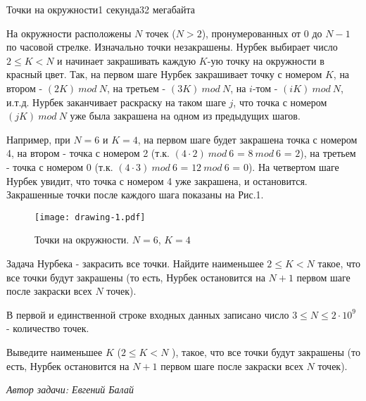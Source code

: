 \documentclass[11pt,a4paper,oneside]{article}
\begin{document}
\begin{problem}{Точки на окружности}{1 секунда}{32 мегабайта}

\noindent
На окружности расположены $N$ точек ($N>2$), пронумерованных от $0$ до $N-1$ по часовой стрелке. 
Изначально точки незакрашены.
Нурбек выбирает число $2 \le K < N$ и начинает закрашивать каждую $K$-ую точку на окружности в красный цвет.
Так, на первом шаге Нурбек закрашивает точку с номером $K$, на втором - $(2K)~mod~N$, на третьем  - $(3K)~mod~N$, на $i$-том - $(iK)~mod~N$, и.т.д. Нурбек заканчивает раскраску на таком шаге $j$, что точка с номером $(jK)~mod~N$ уже была закрашена на одном из предыдущих шагов.

\medskip\noindent
Например, при $N=6$ и $K=4$, на первом шаге будет закрашена точка с номером 4, на втором - точка с номером  2 (т.к. $(4\cdot 2)~mod~6$ = $8~mod~6$ = $2$), на третьем - точка с номером 0 (т.к. $(4 \cdot 3)~mod~6$ = $12~mod~6$ = $0$). На четвертом шаге Нурбек увидит, что точка с номером 4 уже закрашена, и остановится.
Закрашенные точки после каждого шага показаны на Рис.1. 





\begin{figure}[ht]
\centering
\texttt{[image: drawing-1.pdf]}
\caption{ Точки на окружности. $N=6$, $K = 4$}
\end{figure}

\noindent
Задача Нурбека - закрасить все точки. Найдите наименьшее $2 \le K < N$ такое, что все точки будут закрашены (то есть, Нурбек остановится на $N+1$ первом шаге после закраски всех $N$ точек).

\InputFile

\noindent
В первой и единственной строке входных данных записано число $3 \le N \le 2 \cdot 10^9$ -  количество точек.


\OutputFile

\noindent
Выведите  наименьшее $K$ ($2 \le K < N$ ), такое, что все точки будут закрашены (то есть, Нурбек остановится на $N+1$ первом шаге после закраски всех $N$ точек).


\Examples
\begin{example}%
%
%
\end{example}

\vspace{1cm}



\hfill \textit{Автор задачи: Евгений Балай}


\end{problem}
\end{document}
